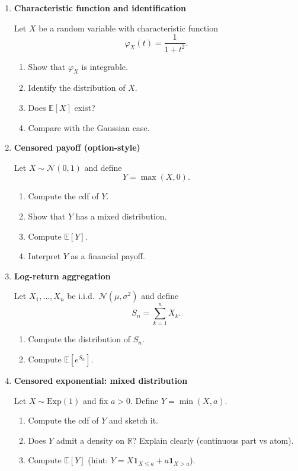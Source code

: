 \documentclass[11pt]{article}
\begin{document}
\begin{enumerate}[leftmargin=*, itemsep=1.2em]
\bigskip

\item \textbf{Characteristic function and identification}

Let $X$ be a random variable with characteristic function
\[
\varphi_X(t)=\frac{1}{1+t^2}.
\]

\begin{enumerate}[label=(\alph*)]
\item Show that $\varphi_X$ is integrable.
\item Identify the distribution of $X$.
\item Does $\mathbb{E}[X]$ exist?
\item Compare with the Gaussian case.
\end{enumerate}

\bigskip

\item \textbf{Censored payoff (option-style)}

Let $X\sim \mathcal{N}(0,1)$ and define
\[
Y=\max(X,0).
\]

\begin{enumerate}[label=(\alph*)]
\item Compute the cdf of $Y$.
\item Show that $Y$ has a mixed distribution.
\item Compute $\mathbb{E}[Y]$.
\item Interpret $Y$ as a financial payoff.
\end{enumerate}

\bigskip

\item \textbf{Log-return aggregation}

Let $X_1,\dots,X_n$ be i.i.d.\ $\mathcal{N}(\mu,\sigma^2)$ and define
\[
S_n=\sum_{k=1}^n X_k.
\]

\begin{enumerate}[label=(\alph*)]
\item Compute the distribution of $S_n$.
\item Compute $\mathbb{E}[e^{S_n}]$.
\end{enumerate}

\bigskip

\item \textbf{Censored exponential: mixed distribution}

Let $X\sim \mathrm{Exp}(1)$ and fix $a>0$. Define $Y=\min(X,a)$.
\begin{enumerate}[label=(\alph*)]
\item Compute the cdf of $Y$ and sketch it.
\item Does $Y$ admit a density on $\mathbb{R}$? Explain clearly (continuous part vs atom).
\item Compute $\mathbb{E}[Y]$ (hint: $Y=X\mathbf{1}_{X\le a}+a\mathbf{1}_{X>a}$).
\end{enumerate}


\end{enumerate}
\end{document}
